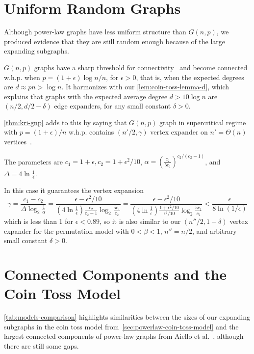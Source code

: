 \section{Uniform Random Graphs}

Although power-law graphs have less uniform structure than $G(n,p)$,
we produced evidence that they are still random enough because of
the large expanding subgraphs.

$G(n,p)$ graphs have a sharp threshold for connectivity~\cite{er59} and
become connected w.h.p. when $p=(1+\epsilon)\log n/n$, for $\epsilon>0$,
that is, when the expected degrees are $d\approx pn>\log n$.
It harmonizes with our \autoref{lem:coin-toss-lemma-d}, which explains
that graphs with the expected average degree $d>10\log n$
are $(n/2,d/2-\delta)$ edge expanders, for any small constant $\delta>0$.

\autoref{thm:kri-gnp} adds to this by saying that $G(n,p)$ graph
in supercritical regime with $p=(1+\epsilon)/n$ w.h.p. contains
$(n'/2,\gamma)$ vertex expander on $n'=\Theta(n)$ vertices~\cite{kri17}.

The parameters are
$c_1=1+\epsilon,c_2=1+\epsilon^2/10$,
$\alpha=\left(\frac{c_2}{5c_1}\right)^{c_2/(c_2-1)}$,
and $\Delta=4\ln\frac{1}{\epsilon}$.

In this case it guarantees the vertex expansion
\begin{equation}
    \gamma=\frac{c_1-c_2}{\Delta\log_2{\frac{1}{\alpha}}}
    =\frac{\epsilon-\epsilon^2/10}{
        \left(4\ln\frac{1}{\epsilon}\right)
        \frac{c_2}{c_2-1}
        \log_2{\frac{5c_1}{c_2}}
    }
    =\frac{\epsilon-\epsilon^2/10}{
        \left(4\ln\frac{1}{\epsilon}\right)
        \frac{1+\epsilon^2/10}{\epsilon^2/10}
        \log_2{\frac{5c_1}{c_2}}
    }
    <\frac{\epsilon}{8\ln(1/\epsilon)}
\end{equation}
which is less than 1 for $\epsilon<0.89$, so it is also similar to
our $(n''/2,1-\delta)$ vertex expander for the permutation model
with $0<\beta<1$, $n''=n/2$, and arbitrary small constant $\delta>0$.

\section{Connected Components and the Coin Toss Model}

\autoref{tab:models-comparison} highlights similarities between the sizes of our
expanding subgraphs in the coin toss model from~\autoref{sec:powerlaw-coin-toss-model}
and the largest connected components of power-law graphs from Aiello et al.~\cite{acl01},
although there are still some gaps.


